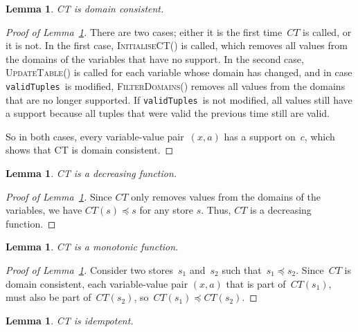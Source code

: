 \documentclass[a4paper,11pt]{article}
\newtheorem{lemma}[theorem]{Lemma}
\newcommand{\Lemmaref}[1]{Lemma~\ref{#1}}
\newcommand{\CurrTable}{\texttt{validTuples}}
\def\UpdateTable{\textsc{UpdateTable}}
\def\FilterDomains{\textsc{FilterDomains}}
\def\InitialiseCT{\textsc{InitialiseCT}}
\numberwithin{equation}{section}
\begin{document}
\begin{lemma}\label{lemma:domain-consistent}
  CT is domain consistent.
\end{lemma}

\begin{proof}[Proof of \Lemmaref{lemma:domain-consistent}]
  There are two cases; either it is the first time~$CT$ is called, or it
  is not.
  In the first case, \InitialiseCT() is called, which removes all values
  from the domains of the variables that have no support.
  In the second case, \UpdateTable() is called for each variable whose
  domain has changed, and in case \CurrTable~is modified, \FilterDomains()
  removes all values from the domains that are no longer supported.
  If \CurrTable~is not modified, all values still have a support because
  all tuples that were valid the previous time still are valid.
  
  So in both cases, every variable-value pair~$(x,a)$ has a support on~$c$,
  which shows that CT is domain consistent.
\end{proof}

\begin{lemma} \label{lemma:decreasing}
  CT is a decreasing function.
\end{lemma}

\begin{proof}[Proof of \Lemmaref{lemma:decreasing}]
  Since $CT$ only removes values from
  the domains of the variables, we have $CT(s) \preceq s$ for any store $s$.
  Thus, $CT$ is a decreasing function.
\end{proof}

\begin{lemma}\label{lemma:monotonic}
  CT is a monotonic function.
\end{lemma}

\begin{proof}[Proof of \Lemmaref{lemma:monotonic}]
  Consider two stores~$s_1$ and~$s_2$ such that~$s_1 \preceq s_2$.
  Since~$CT$ is domain consistent, each variable-value pair $(x,a)$
  that is part of~$CT(s_1)$, must also be part of~$CT(s_2)$,
  so~$CT(s_1) \preceq CT(s_2)$.
\end{proof}


\begin{lemma}\label{lemma:idempotent}
  CT is idempotent.
\end{lemma}
\end{document}
